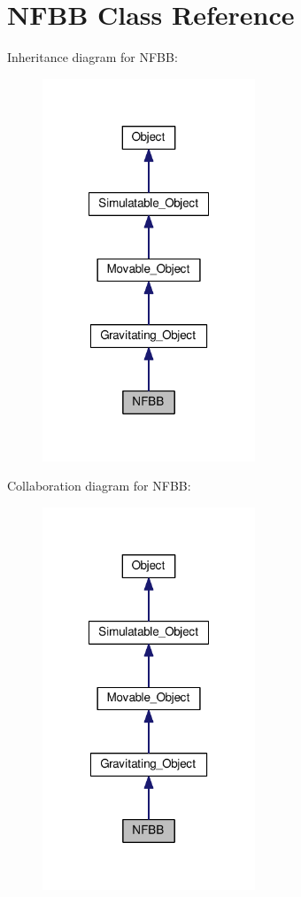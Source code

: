 \hypertarget{classNFBB}{\section{N\+F\+B\+B Class Reference}
\label{classNFBB}
}


Inheritance diagram for N\+F\+B\+B\+:\nopagebreak
\begin{figure}[H]
\begin{center}
\leavevmode
\includegraphics[width=180pt]{classNFBB__inherit__graph}
\end{center}
\end{figure}


Collaboration diagram for N\+F\+B\+B\+:\nopagebreak
\begin{figure}[H]
\begin{center}
\leavevmode
\includegraphics[width=180pt]{classNFBB__coll__graph}
\end{center}
\end{figure}
